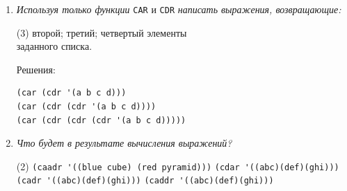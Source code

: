 \begin{enumerate}[wide=0pt]
\item  \textit{Используя только функции} \texttt{CAR} и \texttt{CDR} \textit{написать выражения, возвращающие:}
\begin{tasks}[label=\arabic*), item-indent=3pt, after-item-skip=1pt](3)
	\task второй; \task третий; \task четвертый элементы \\ заданного списка.
\end{tasks}
Решения:
\begin{lstlisting}
(car (cdr '(a b c d)))
(car (cdr (cdr '(a b c d))))
(car (cdr (cdr (cdr '(a b c d)))))
\end{lstlisting}
\item \textit{Что будет в результате вычисления выражений?}
\begin{tasks}[label=\arabic*), item-indent=3pt, after-item-skip=1pt, column-sep=20pt](2)
	\task \lstinline{(caadr '((blue cube) (red pyramid)))}
	\task \lstinline{(cdar '((abc)(def)(ghi)))}
	\task \lstinline{(cadr '((abc)(def)(ghi)))}
	\task \lstinline{(caddr '((abc)(def)(ghi)))}
\end{tasks}


\end{enumerate}
